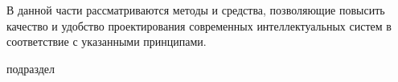 \begin{partbacktext}
В данной части рассматриваются методы и средства, позволяющие повысить качество и удобство проектирования современных интеллектуальных систем в соответствие с указанными принципами.

\begin{scnrelfromlist}{подраздел}
\end{scnrelfromlist}

\end{partbacktext}




